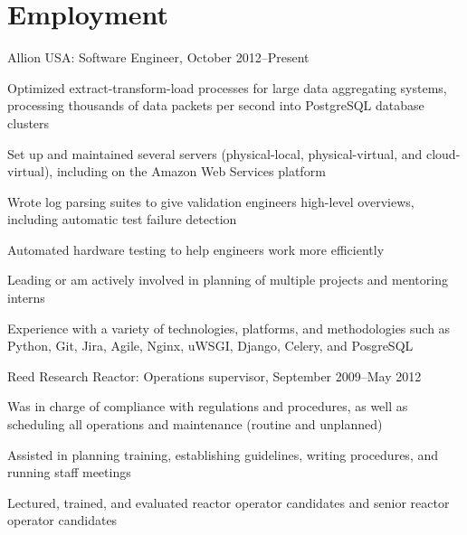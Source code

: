 \documentclass[letterpaper]{article}
\renewenvironment{itemize}{\begin{list}{}{\setlength{\leftmargin}{1.5em}}}{\end{list}}%
\begin{document}
\section*{Employment}%

\begin{itemize}
\item Allion USA: Software Engineer, October 2012--Present
	\begin{itemize}
    \item Optimized extract-transform-load processes for large data aggregating systems, processing thousands of data packets per second into PostgreSQL database clusters
    \item Set up and maintained several servers (physical-local, physical-virtual, and cloud-virtual), including on the Amazon Web Services platform%
    \item Wrote log parsing suites to give validation engineers high-level overviews, including automatic test failure detection
    \item Automated hardware testing to help engineers work more efficiently 
    \item Leading or am actively involved in planning of multiple projects and mentoring interns
    \item Experience with a variety of technologies, platforms, and methodologies such as Python, Git, Jira, Agile, Nginx, uWSGI, Django, Celery, and PosgreSQL 
	\end{itemize}
\item Reed Research Reactor: Operations supervisor, September 2009--May 2012
	\begin{itemize}
	\item Was in charge of compliance with regulations and procedures, as well as scheduling all operations and maintenance (routine and unplanned)
	\item Assisted in planning training, establishing guidelines, writing procedures, and running staff meetings
	\item Lectured, trained, and evaluated reactor operator candidates and senior reactor operator candidates

\end{itemize}
\end{itemize}
\end{document}
